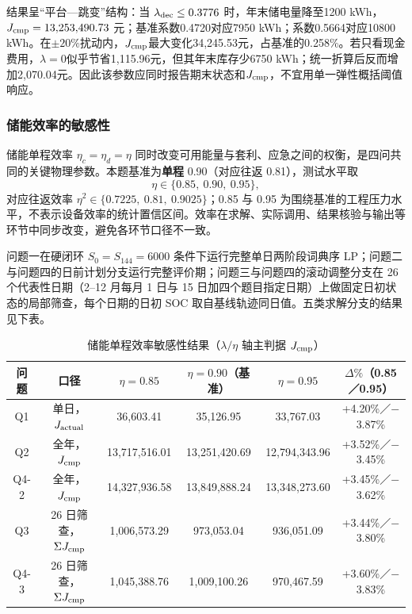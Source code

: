 \documentclass[withoutpreface,bwprint]{cumcmthesis}
\begin{document}
结果呈“平台—跳变”结构：当 \(\lambda_{\rm dec}\leq0.3776\) 时，年末储电量降至1200 kWh，\(J_{\rm cmp}=13{,}253{,}490.73\) 元；基准系数0.4720对应7950 kWh；系数0.5664对应10800 kWh。在\(\pm20\%\)扰动内，\(J_{\rm cmp}\)最大变化34,245.53元，占基准的0.258\%。若只看现金费用，\(\lambda=0\)似乎节省1,115.96元，但其年末库存少6750 kWh；统一折算后反而增加2,070.04元。因此该参数应同时报告期末状态和\(J_{\rm cmp}\)，不宜用单一弹性概括阈值响应。
\subsubsection{储能效率的敏感性}

储能单程效率 \(\eta_c=\eta_d=\eta\) 同时改变可用能量与套利、应急之间的权衡，是四问共同的关键物理参数。本题基准为\textbf{单程} 0.90（对应往返 0.81），测试水平取
\begin{equation}
\eta\in\{0.85,\ 0.90,\ 0.95\},
\end{equation}
对应往返效率 \(\eta^{2}\in\{0.7225,\ 0.81,\ 0.9025\}\)；0.85 与 0.95 为围绕基准的工程压力水平，不表示设备效率的统计置信区间。效率在求解、实际调用、结果核验与输出等环节中同步改变，避免各环节口径不一致。

问题一在硬闭环 \(S_{0}=S_{144}=6000\) 条件下运行完整单日两阶段词典序 LP；问题二与问题四的日前计划分支运行完整评价期；问题三与问题四的滚动调整分支在 26 个代表性日期（2--12 月每月 1 日与 15 日加四个题目指定日期）上做固定日初状态的局部筛查，每个日期的日初 SOC 取自基线轨迹同日值。五类求解分支的结果见下表。

\begin{table}[!htbp]
\centering
\caption{储能单程效率敏感性结果（\(\lambda/\eta\) 轴主判据 \(J_{\rm cmp}\)）}
\footnotesize
\begin{tabular}{|c|c|c|c|c|c|}
\hline
问题 & 口径 & \(\eta=0.85\) & \(\eta=0.90\)（基准） & \(\eta=0.95\) & \(\Delta\%\)（0.85／0.95） \\
\hline
Q1 & 单日，\(J_{\rm actual}\) & 36,603.41 & 35,126.95 & 33,767.03 & +4.20\%／$-$3.87\% \\
\hline
Q2 & 全年，\(J_{\rm cmp}\) & 13,717,516.01 & 13,251,420.69 & 12,794,343.96 & +3.52\%／$-$3.45\% \\
\hline
Q4-2 & 全年，\(J_{\rm cmp}\) & 14,327,936.58 & 13,849,888.24 & 13,348,273.60 & +3.45\%／$-$3.62\% \\
\hline
Q3 & 26 日筛查，\(\Sigma J_{\rm cmp}\) & 1,006,573.29 & 973,053.04 & 936,051.09 & +3.44\%／$-$3.80\% \\
\hline
Q4-3 & 26 日筛查，\(\Sigma J_{\rm cmp}\) & 1,045,388.76 & 1,009,100.26 & 970,467.59 & +3.60\%／$-$3.83\% \\
\hline
\end{tabular}
\end{table}
\end{document}
